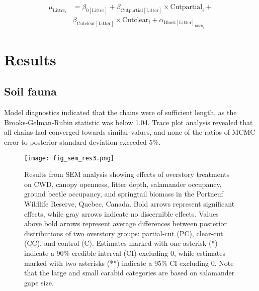 \begin{align}
  \mu_{\text{Litter}_i} &= \beta_{0[\text{Litter}]} + \beta_{\text{Cutpartial}[\text{Litter}]} \times \text{Cutpartial}_{i} + \nonumber\\
  & \beta_{\text{Cutclear}[\text{Litter}]} \times \text{Cutclear}_{i} + \alpha_{\text{Block}[\text{Litter}]_{\text{block}_i}} \nonumber
\end{align}


\clearpage

\section*{Results}
\label{sec:results1}


\subsection*{Soil fauna}
\label{subsec:taxa}

Model diagnostics indicated that the chains were of sufficient length, as the Brooks-Gelman-Rubin statistic was below 1.04. 
Trace plot analysis revealed that all chains had converged towards similar values, and none of the ratios of MCMC error to posterior standard deviation exceeded 5\%.

\vspace{10pt}

\begin{figure}[ht]
	\centering
	\texttt{[image: fig\_sem\_res3.png]}
	\caption[Results from structural equation modeling analysis revealing effects of overstory treatments on coarse woody debris volume,
  canopy openness, litter depth, salamander occupancy, ground beetle occupancy, and springtail biomass.]
  {Results from SEM analysis showing effects of overstory treatments on CWD, 
  canopy openness, litter depth, salamander occupancy, ground beetle occupancy, and springtail biomass in the Portneuf Wildlife Reserve, 
  Quebec, Canada. Bold arrows represent significant effects, while gray arrows indicate no discernible effects. 
  Values above bold arrows represent average differences between posterior distributions of two overstory groups: 
  partial-cut (PC), clear-cut (CC), and control (C). Estimates marked with one asterisk (*) 
  indicate a 90\% credible interval (CI) excluding 0, while estimates marked with two asterisks (**) indicate a 95\% CI excluding 0. 
  Note that the large and small carabid categories are based on salamander gape size.}
	\label{fig:SEMres}
\end{figure}  

